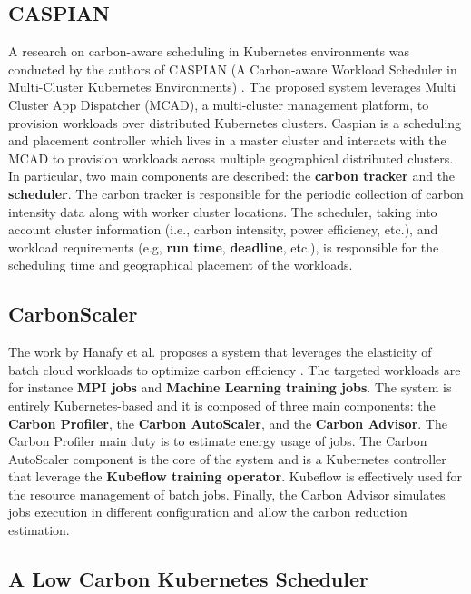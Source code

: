\subsection{CASPIAN}

A research on carbon-aware scheduling in Kubernetes environments was conducted by the authors of CASPIAN (A Carbon-aware Workload Scheduler in Multi-Cluster Kubernetes Environments) \cite{10786568}.
The proposed system leverages Multi Cluster App Dispatcher (MCAD), a multi-cluster management platform, to provision workloads over distributed Kubernetes clusters.
Caspian is a scheduling and placement controller which lives in a master cluster and interacts with the MCAD to provision workloads across multiple geographical distributed clusters.
In particular, two main components are described: the \textbf{carbon tracker} and the \textbf{scheduler}.
The carbon tracker is responsible for the periodic collection of carbon intensity data along with worker cluster locations.
The scheduler, taking into account cluster information (i.e., carbon intensity, power efficiency, etc.), and workload requirements (e.g, \textbf{run time}, \textbf{deadline}, etc.), is responsible for the scheduling time and geographical placement of the workloads.

\subsection{CarbonScaler}

The work by Hanafy et al. \cite{10.1145/3626788} proposes a system that leverages the elasticity of batch cloud workloads to optimize carbon efficiency .
The targeted workloads are for instance \textbf{MPI jobs} and \textbf{Machine Learning training jobs}.
The system is entirely Kubernetes-based and it is composed of three main components: the \textbf{Carbon Profiler}, the \textbf{Carbon AutoScaler}, and the \textbf{Carbon Advisor}.
The Carbon Profiler main duty is to estimate energy usage of jobs.
The Carbon AutoScaler component is the core of the system and is a Kubernetes controller that leverage the \textbf{Kubeflow training operator}.
Kubeflow is effectively used for the resource management of batch jobs.
Finally, the Carbon Advisor simulates jobs execution in different configuration and allow the carbon reduction estimation.

\subsection{A Low Carbon Kubernetes Scheduler}
\label{sec:low_carbon_k8s_scheduler}

